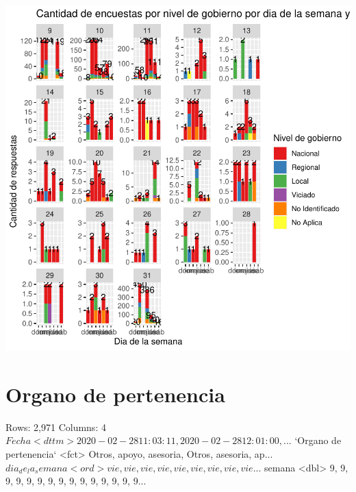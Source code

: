 \documentclass{article}
\begin{document}
\includegraphics{seguimientov5-032}


\section{Organo de pertenencia}

\begin{Schunk}
\begin{Soutput}
Rows: 2,971
Columns: 4
$ Fecha                   <dttm> 2020-02-28 11:03:11, 2020-02-28 12:01:00, ...
$ `Organo de pertenencia` <fct> Otros, apoyo, asesoria, Otros, asesoria, ap...
$ dia_de_la_semana        <ord> vie, vie, vie, vie, vie, vie, vie, vie, vie...
$ semana                  <dbl> 9, 9, 9, 9, 9, 9, 9, 9, 9, 9, 9, 9, 9, 9, 9...
\end{Soutput}
\end{Schunk}
\end{document}

